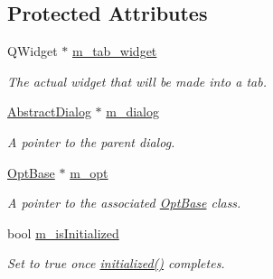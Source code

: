 \subsection*{Protected Attributes}
\begin{DoxyCompactItemize}
\item 
\hypertarget{classGlobalSearch_1_1AbstractTab_a7c461733097abaefd6709de1516b2b6b}{Q\-Widget $\ast$ \hyperlink{classGlobalSearch_1_1AbstractTab_a7c461733097abaefd6709de1516b2b6b}{m\-\_\-tab\-\_\-widget}}\label{classGlobalSearch_1_1AbstractTab_a7c461733097abaefd6709de1516b2b6b}

\begin{DoxyCompactList}\small\item\em The actual widget that will be made into a tab. \end{DoxyCompactList}\item 
\hypertarget{classGlobalSearch_1_1AbstractTab_a1bbcd914bf7dfc64f0c7212719ce8001}{\hyperlink{classGlobalSearch_1_1AbstractDialog}{Abstract\-Dialog} $\ast$ \hyperlink{classGlobalSearch_1_1AbstractTab_a1bbcd914bf7dfc64f0c7212719ce8001}{m\-\_\-dialog}}\label{classGlobalSearch_1_1AbstractTab_a1bbcd914bf7dfc64f0c7212719ce8001}

\begin{DoxyCompactList}\small\item\em A pointer to the parent dialog. \end{DoxyCompactList}\item 
\hypertarget{classGlobalSearch_1_1AbstractTab_a1bf5c32868bc8e6024358078838fb87a}{\hyperlink{classGlobalSearch_1_1OptBase}{Opt\-Base} $\ast$ \hyperlink{classGlobalSearch_1_1AbstractTab_a1bf5c32868bc8e6024358078838fb87a}{m\-\_\-opt}}\label{classGlobalSearch_1_1AbstractTab_a1bf5c32868bc8e6024358078838fb87a}

\begin{DoxyCompactList}\small\item\em A pointer to the associated \hyperlink{classGlobalSearch_1_1OptBase}{Opt\-Base} class. \end{DoxyCompactList}\item 
\hypertarget{classGlobalSearch_1_1AbstractTab_a98d4e176a6385cc5ef29c1436cac1e46}{bool \hyperlink{classGlobalSearch_1_1AbstractTab_a98d4e176a6385cc5ef29c1436cac1e46}{m\-\_\-is\-Initialized}}\label{classGlobalSearch_1_1AbstractTab_a98d4e176a6385cc5ef29c1436cac1e46}

\begin{DoxyCompactList}\small\item\em Set to true once \hyperlink{classGlobalSearch_1_1AbstractTab_aed63eed75abeb8c0e1e87344225f95cd}{initialized()} completes. \end{DoxyCompactList}\end{DoxyCompactItemize}


